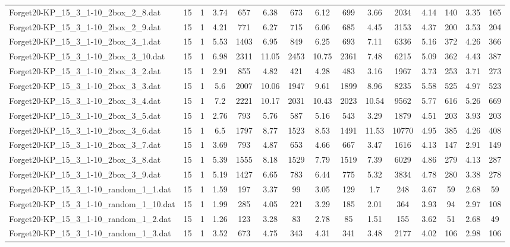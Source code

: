 \begin{table}[!ht]
{\begin{tabular}{lcccccccccccccc}
Forget20-KP\_15\_3\_1-10\_2box\_2\_8.dat & 15 & 1 & 3.74 & 657 & 6.38 & 673 & 6.12 & 699 & 3.66 & 2034 & 4.14 & 140 & 3.35 & 165 \\
Forget20-KP\_15\_3\_1-10\_2box\_2\_9.dat & 15 & 1 & 4.21 & 771 & 6.27 & 715 & 6.06 & 685 & 4.45 & 3153 & 4.37 & 200 & 3.53 & 204 \\
Forget20-KP\_15\_3\_1-10\_2box\_3\_1.dat & 15 & 1 & 5.53 & 1403 & 6.95 & 849 & 6.25 & 693 & 7.11 & 6336 & 5.16 & 372 & 4.26 & 366 \\
Forget20-KP\_15\_3\_1-10\_2box\_3\_10.dat & 15 & 1 & 6.98 & 2311 & 11.05 & 2453 & 10.75 & 2361 & 7.48 & 6215 & 5.09 & 362 & 4.43 & 387 \\
Forget20-KP\_15\_3\_1-10\_2box\_3\_2.dat & 15 & 1 & 2.91 & 855 & 4.82 & 421 & 4.28 & 483 & 3.16 & 1967 & 3.73 & 253 & 3.71 & 273 \\
Forget20-KP\_15\_3\_1-10\_2box\_3\_3.dat & 15 & 1 & 5.6 & 2007 & 10.06 & 1947 & 9.61 & 1899 & 8.96 & 8235 & 5.58 & 525 & 4.97 & 523 \\
Forget20-KP\_15\_3\_1-10\_2box\_3\_4.dat & 15 & 1 & 7.2 & 2221 & 10.17 & 2031 & 10.43 & 2023 & 10.54 & 9562 & 5.77 & 616 & 5.26 & 669 \\
Forget20-KP\_15\_3\_1-10\_2box\_3\_5.dat & 15 & 1 & 2.76 & 793 & 5.76 & 587 & 5.16 & 543 & 3.29 & 1879 & 4.51 & 203 & 3.93 & 203 \\
Forget20-KP\_15\_3\_1-10\_2box\_3\_6.dat & 15 & 1 & 6.5 & 1797 & 8.77 & 1523 & 8.53 & 1491 & 11.53 & 10770 & 4.95 & 385 & 4.26 & 408 \\
Forget20-KP\_15\_3\_1-10\_2box\_3\_7.dat & 15 & 1 & 3.69 & 793 & 4.87 & 653 & 4.66 & 667 & 3.47 & 1616 & 4.13 & 147 & 2.91 & 149 \\
Forget20-KP\_15\_3\_1-10\_2box\_3\_8.dat & 15 & 1 & 5.39 & 1555 & 8.18 & 1529 & 7.79 & 1519 & 7.39 & 6029 & 4.86 & 279 & 4.13 & 287 \\
Forget20-KP\_15\_3\_1-10\_2box\_3\_9.dat & 15 & 1 & 5.19 & 1427 & 6.65 & 783 & 6.44 & 775 & 5.32 & 3834 & 4.78 & 280 & 3.38 & 278 \\
Forget20-KP\_15\_3\_1-10\_random\_1\_1.dat & 15 & 1 & 1.59 & 197 & 3.37 & 99 & 3.05 & 129 & 1.7 & 248 & 3.67 & 59 & 2.68 & 59 \\
Forget20-KP\_15\_3\_1-10\_random\_1\_10.dat & 15 & 1 & 1.99 & 285 & 4.05 & 221 & 3.29 & 185 & 2.01 & 364 & 3.93 & 94 & 2.97 & 108 \\
Forget20-KP\_15\_3\_1-10\_random\_1\_2.dat & 15 & 1 & 1.26 & 123 & 3.28 & 83 & 2.78 & 85 & 1.51 & 155 & 3.62 & 51 & 2.68 & 49 \\
Forget20-KP\_15\_3\_1-10\_random\_1\_3.dat & 15 & 1 & 3.52 & 673 & 4.75 & 343 & 4.31 & 341 & 3.48 & 2177 & 4.02 & 106 & 2.98 & 106 \\

\end{tabular}}
\end{table}

